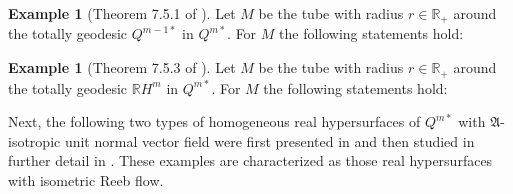 \documentclass[reqno]{amsart}%
\theoremstyle{definition}
\newtheorem{example}[theorem]{Example}
\numberwithin{equation}{section}
\begin{document}
\begin{example}[Theorem 7.5.1 of \cite{BS-2022}]\label{ex:3.2}
Let $M$ be the tube with radius $r\in \mathbb{R}_+$ around the totally geodesic $Q^{m-1*}$ in $Q^{m*}$. For $M$ the following statements hold:
%
\end{example}


\begin{example}[Theorem 7.5.3 of \cite{BS-2022}]\label{ex:3.3}
Let $M$ be the tube with radius $r\in \mathbb{R}_+$ around the totally geodesic $\mathbb{R}H^m$ in $Q^{m*}$. For $M$ the following statements hold:
%
\end{example}




Next, the following two types of homogeneous real hypersurfaces of $Q^{m*}$ with $\mathfrak{A}$-isotropic unit normal vector field were first presented in \cite{Suh4}
and then studied in further detail in \cite{BS-2022}. These examples are characterized as those real hypersurfaces with isometric Reeb flow.
\end{document}
